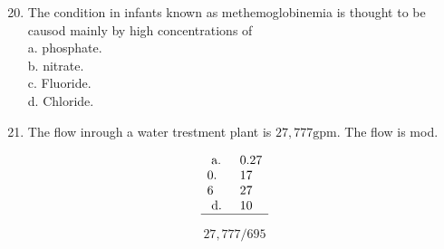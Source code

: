 \documentclass[10pt]{article}
\begin{document}
\begin{enumerate}
  \setcounter{enumi}{19}
  \item The condition in infants known as methemoglobinemia is thought to be causod mainly by high concentrations of\\
a. phosphate.\\
b. nitrate.\\
c. Fluoride.\\
d. Chloride.

  \item The flow inrough a water trestment plant is $27,777 \mathrm{gpm}$. The flow is mod.

\end{enumerate}

$$
\begin{array}{ll}
\text { a. } & 0.27 \\
0 . & 17 \\
6 & 27 \\
\text { d. } & 10 \\
\hline
\end{array}
$$

$$
27,777 / 695
$$
\end{document}

